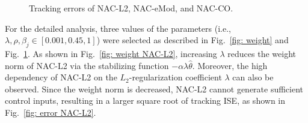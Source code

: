 \documentclass[letterpaper, 10 pt, conference]{ieeeconf}  %
\begin{document}
\begin{figure}[!t]      
    \centering
    \vfill
    \vfill
    \vfill
    \caption{Tracking errors of NAC-L2, NAC-eMod, and NAC-CO.}
    \label{fig: error}
\end{figure}

For the detailed analysis, three values of the parameters (i.e., $\lambda,\rho,\beta_j\in[0.001,0.45,1]$) were selected as described in Fig.~\ref{fig: weight} and Fig.~\ref{fig: error}.
As shown in Fig.~\ref{fig: weight NAC-L2}, increasing $\lambda$ reduces the weight norm of NAC-L2 via the stabilizing function $-\alpha\lambda\hat\theta$.
Moreover, the high dependency of NAC-L2 on the $L_2$-regularization coefficient $\lambda$ can also be observed.
Since the weight norm is decreased, NAC-L2 cannot generate sufficient control inputs, resulting in a larger square root of tracking ISE, as shown in Fig.~\ref{fig: error NAC-L2}.
\end{document}
